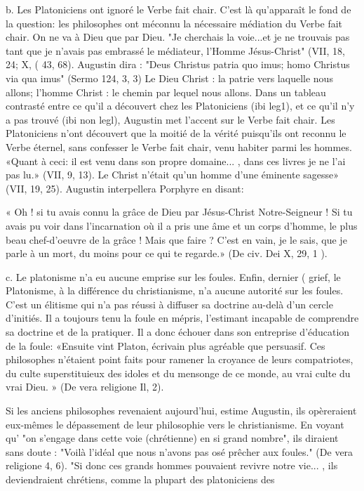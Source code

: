 b.	Les Platoniciens ont ignoré le Verbe fait chair. C'est là qu'apparaît le fond de la question: les philosophes ont méconnu la nécessaire médiation du Verbe fait chair. On ne va à Dieu que par Dieu. "Je cherchais la voie...et je ne trouvais pas tant
que je n'avais pas embrassé le médiateur, l'Homme Jésus-Christ" (VII, 18, 24; X,	(
43, 68). Augustin dira : "Deus Christus patria quo imus; homo Christus via qua imus" (Sermo 124, 3, 3) Le Dieu Christ : la patrie vers laquelle nous allons; l'homme Christ : le chemin par lequel nous allons. Dans un tableau contrasté entre ce qu'il a découvert chez les Platoniciens (ibi leg1), et ce qu'il n'y a pas trouvé (ibi non legl), Augustin met l'accent sur le Verbe fait chair. Les Platoniciens n'ont découvert que la moitié de la vérité puisqu'ils ont reconnu le Verbe éternel, sans confesser le Verbe fait chair, venu habiter parmi les hommes. «Quant à ceci: il est venu dans son propre domaine... , dans ces livres je ne l'ai pas lu.» (VII, 9, 13). Le Christ n'était qu'un homme d'une éminente sagesse» (VII, 19, 25). Augustin interpellera Porphyre en disant:

« Oh ! si tu avais connu la grâce de Dieu par Jésus-Christ Notre-Seigneur ! Si tu avais pu voir dans l'incarnation où il a pris une âme et un corps d'homme, le plus beau chef-d'oeuvre de la grâce ! Mais que faire ? C'est en vain, je le sais, que je parle à un mort, du moins pour ce qui te regarde.» (De civ. Dei X, 29, 1 ).

c.	Le platonisme n'a eu aucune  emprise sur les foules. Enfin, dernier	(
grief, le Platonisme, à la différence du christianisme,	n'a aucune autorité sur les
foules. C'est un élitisme qui n'a pas réussi à diffuser sa doctrine au-delà d'un cercle d'initiés. Il a toujours tenu la foule en mépris, l'estimant incapable de comprendre sa doctrine et de la pratiquer. Il a donc échouer dans son entreprise d'éducation de la foule: «Ensuite vint Platon, écrivain plus agréable que persuasif. Ces philosophes n'étaient point faits pour ramener la croyance de leurs compatriotes, du culte superstituieux des idoles et du mensonge de ce monde, au vrai culte du vrai Dieu. » (De vera religione Il, 2).

Si les anciens philosophes revenaient aujourd'hui, estime Augustin, ils opèreraient eux-mêmes le dépassement de leur philosophie vers le christianisme. En voyant qu' "on s'engage dans cette voie (chrétienne) en si grand nombre", ils diraient sans doute : "Voilà l'idéal que nous n'avons pas osé prêcher aux foules." (De vera religione  4, 6). "Si donc ces grands hommes pouvaient revivre notre vie... , ils deviendraient chrétiens, comme la plupart des platoniciens des

